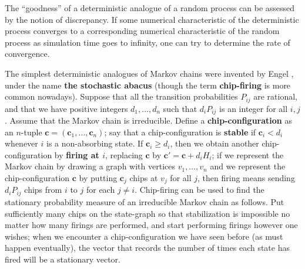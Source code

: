 The ``goodness'' of a deterministic analogue of a random process
can be assessed by the notion of discrepancy.
If some numerical characteristic of the deterministic process
converges to a corresponding numerical characteristic of the random process
as simulation time goes to infinity,
one can try to determine the rate of convergence.

The simplest deterministic analogues of Markov chains
were invented by Engel \cite{engel1975probabilistic,engel1976does}, 
under the name \textbf{the stochastic abacus}
(though the term \textbf{chip-firing} is more common nowadays).
Suppose that all the transition probabilities $P_{ij}$ are rational,
and that we have positive integers $d_1,\dots,d_n$
such that $d_i P_{ij}$ is an integer for all $i,j$.
Assume that the Markov chain is irreducible.
Define a \textbf{chip-configuration} as 
an $n$-tuple $\mathbf{c} = (\mathbf{c}_1,\dots,\mathbf{c}_n)$;
say that a chip-configuration is \textbf{stable}
if $\mathbf{c}_i < d_i$ whenever $i$ is a non-absorbing state.
If $\mathbf{c}_i \geq d_i$, then we obtain another chip-configuration 
by \textbf{firing at $i$}, replacing $\mathbf{c}$ by
$\mathbf{c'} = \mathbf{c} + d_i H_i$;
if we represent the Markov chain by drawing a graph with vertices $v_1,\dots,v_n$
and we represent the chip-configuration $\mathbf{c}$ 
by putting $\mathbf{c}_j$ chips at $v_j$ for all $j$,
then firing means sending $d_i P_{ij}$ chips 
from $i$ to $j$ for each $j \neq i$.
Chip-firing can be used to find the stationary probability measure 
of an irreducible Markov chain as follows.
Put sufficiently many chips on the state-graph so that 
stabilization is impossible no matter how many firings are performed, 
and start performing firings however one wishes;
when we encounter a chip-configuration we have seen before
(as must happen eventually), the vector that records the number of times
each state has fired will be a stationary vector.

